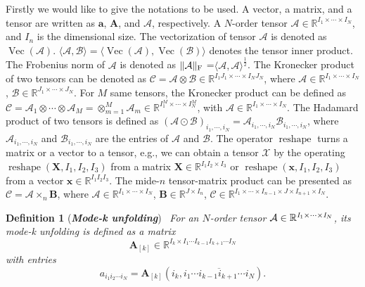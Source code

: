 \documentclass{article}
\begin{document}
Firstly we would like to give the notations to be used. A vector, a matrix, and a tensor are written as  $  \mathbf{a} $,  $  \mathbf{A} $, and $\mathcal{A}$, respectively. A $ N $-order tensor $ \mathcal{A} \in \mathbb{R}^{ I_{1} \times\cdots\times I_{N}}$, and $I_{n}$ is the dimensional size. The vectorization of tensor $\mathcal{A}$ is denoted as $\operatorname {Vec}({\mathcal{A}})$. 
$\langle{\mathcal A, \mathcal B}\rangle =\langle \operatorname{Vec}(\mathcal{A}),\operatorname{Vec}(\mathcal{B})\rangle  $ denotes the tensor inner product. The Frobenius norm of $\mathcal{ A} $ is denoted as $\lVert{\mathcal A}\rVert_{\text F}$ =$\langle{\mathcal A,\mathcal A}\rangle^\frac{1}{2} $. The Kronecker product of two tensors can be denoted as $\mathcal{C}=\mathcal{A}\otimes\mathcal{B}\in\mathbb{R}^{I_{1}J_{1}\times\cdots\times I_{N}J_{N}}$, where $\mathcal{A}\in\mathbb{R}^{I_{1}\times\cdots\times I_{N}}$, $\mathcal{B}\in \mathbb{R}^{J_{1}\times\cdots\times J_{N}}$. For $M$ same tensors, the Kronecker product can be defined as $\mathcal{C}=\mathcal{A}_{1}\otimes\cdots\otimes\mathcal{A}_{M}=\otimes_{m=1}^{M}\mathcal{A}_{m}\in\mathbb{R}^{I_{1}^{M}\times\cdots\times I_{N}^{M}}$, with $\mathcal{A}\in\mathbb{R}^{I_{1}\times\cdots\times I_{N}}$.
The Hadamard product of two tensors is defined as $(\mathcal{A} \odot \mathcal{B})_{i_1, \cdots , i_N}=\mathcal{A}_{i_1, \cdots , i_N}\mathcal{B}_{i_1, \cdots , i_N}$, where $ {\mathcal{A}}_{i_1, \cdots , i_N} $ and $ {\mathcal{B}}_{i_1, \cdots , i_N} $ are the entries of $ {\mathcal{A}} $ and $ {\mathcal{B}} $. 
The operator $\operatorname{reshape}$ turns a matrix or a vector to a tensor, e.g., we can obtain a tensor $\mathcal{X}$ by the operating $\operatorname{reshape}(\mathbf{X}, I_{1}, I_{2},I_{3})$ from a matrix $\mathbf{X}\in \mathbb{R}^{I_{1}I_{2}\times I_{3}}$ or $\operatorname{reshape}(\mathbf{x}, I_{1}, I_{2},I_{3})$ from a vector $\mathbf{x}\in \mathbb{R}^{I_{1}I_{2}I_{3}}$. The mide-$n$ tensor-matrix product can be presented as $\mathcal{C}=\mathcal{A}\times_{n}\mathbf{B}$, where $\mathcal{A}\in \mathbb{R}^{I_{1} \times\cdots\times I_{N}}$, $\mathbf{B}\in \mathbb{R}^{J\times I_{n}}$, $\mathcal{C}\in \mathbb{R}^{I_{1} \times\cdots\times I_{n-1}\times J\times I_{n+1} \times I_{N}}$.

\textbf{Definition 1} (\emph{\textbf{Mode-k unfolding}})~\cite{cichocki2014tensor}
\emph{For an  $N$-order tensor $\mathcal{A} \in \mathbb{R}^{\emph{I}_{1} \times\cdots\times \emph{I}_{N}}$, its mode-k unfolding is defined as a matrix }
\begin{equation}
\textbf{A}_{[k]} \in \mathbb{R}^{I_k\times I_{1} \cdots I_{k-1}I_{k+1}\cdots I_N}\nonumber
\end{equation}
\emph{with entries}
\begin{equation}
a_{i_1i_2\cdots i_N}=\textbf{A}_{[k]}( i_k,\overline{i_{1}\cdots i_{k-1}i_{k+1}\cdots i_N}) \nonumber.
\end{equation}
\end{document}
